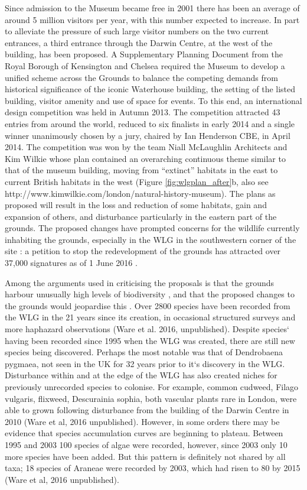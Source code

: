 Since admission to the Museum became free in 2001 there has been an average of around 5 million visitors per year, with this number expected to increase. In part to alleviate the pressure of such large visitor numbers on the two current entrances, a third entrance through the Darwin Centre, at the west of the building, has been proposed. A Supplementary Planning Document from the Royal Borough of Kensington and Chelsea \citep{rbkc:2012} required the Museum to develop a unified scheme across the Grounds to balance the competing demands from historical significance of the iconic Waterhouse building, the setting of the listed building, visitor amenity and use of space for events. To this end, an international design competition was held in Autumn 2013. The competition attracted 43 entries from around the world, reduced to six finalists in early 2014 and a single winner unanimously chosen by a jury, chaired by Ian Henderson CBE, in April 2014. The competition was won by the team Niall McLaughlin Architects and Kim Wilkie whose plan contained an overarching continuous theme similar to that of the museum building, moving from ``extinct'' habitats in the east to current British habitats in the west (Figure \ref{fig:wlgplan_after}b, also see http://www.kimwilkie.com/london/natural-history-museum). The plans as proposed will result in the loss and reduction of some habitats, gain and expansion of others, and disturbance particularly in the eastern part of the grounds. The proposed changes have prompted concerns for the wildlife currently inhabiting the grounds, especially in the WLG in the southwestern corner of the site \citep{prospect:2015wg, guardian:2015wg, avery:2015wg, telegraph:2015wg, dailymail:2015wg}: a petition to stop the redevelopment of the grounds has attracted over 37,000 signatures as of 1 June 2016 \citep{changepetition:2015wg}.  

Among the arguments used in criticising the proposals is that the grounds harbour unusually high levels of biodiversity \citep{changepetition:2015wg}, and that the proposed changes to the grounds would jeopardise this \citep{avery:2015wg}. Over 2800 species have been recorded from the WLG in the 21 years since its creation, in occasional structured surveys and more haphazard observations (Ware et al. 2016, unpublished). Despite species` having been recorded since 1995 when the WLG was created, there are still new species being discovered.  Perhaps the most notable was that of Dendrobaena pygmaea, not seen in the UK for 32 years prior to it`s discovery in the WLG.  Disturbance within and at the edge of the WLG has also created niches for previously unrecorded species to colonise. For example, common cudweed, Filago vulgaris, flixweed, Descurainia sophia, both vascular plants rare in London, were able to grown following disturbance from the building of the Darwin Centre in 2010 (Ware et al, 2016 unpublished).  However, in some orders there may be evidence that species accumulation curves are beginning to plateau.  Between 1995 and 2003 100 species of algae were recorded, however, since 2003 only 10 more species have been added. But this pattern is definitely not shared by all taxa; 18 species of Araneae were recorded by 2003, which had risen to 80 by 2015 (Ware et al, 2016 unpublished). 

